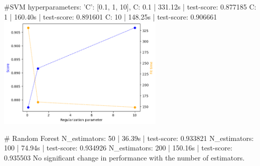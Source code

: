 \documentclass[12pt, letterpaper]{article}
\begin{document}
#SVM
hyperparameters: 'C': [0.1, 1, 10],
C: 0.1 | 331.12s | test-score: 0.877185
C: 1 | 160.40s | test-score: 0.891601
C: 10 | 148.25s | test-score: 0.906661
\includegraphics[width=0.6\textwidth]{svm_c_compiled.png}

# Random Forest
N_estimators: 50 | 36.39s | test-score: 0.933821
N_estimators: 100 | 74.94s | test-score: 0.934926
N_estimators: 200 | 150.16s | test-score: 0.935503
No significant change in performance with the number of estimators.
\end{document}
